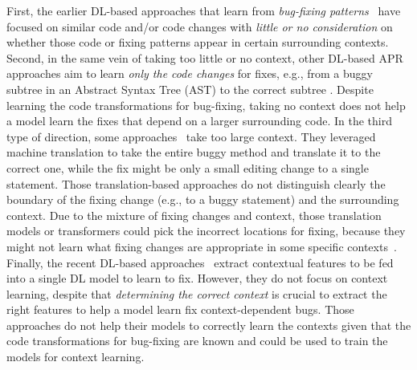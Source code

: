 First, the earlier DL-based approaches that learn from {\em bug-fixing
  patterns}~\cite{white2016deep,gupta2017deepfix} have focused on
similar code and/or code changes with {\em little or no consideration}
on whether those code or fixing patterns appear in certain surrounding
contexts. Second, in the same vein of taking too little or no context,
other DL-based APR approaches aim to learn {\em only the code changes}
for fixes, e.g., from a buggy subtree in an Abstract Syntax Tree (AST)
to the correct subtree \cite{chakrabortycodit,see2017get}. Despite
learning the code transformations for bug-fixing, taking no context
does not help a model learn the fixes that depend on a larger
surrounding code. In the third type of direction, some
approaches~\cite{hata2018learning,tufano2019learning,tufano2018empirical}
take too large context. They leveraged machine translation to take the
entire buggy method and translate it to the correct one, while the fix
might be only a small editing change to a single statement. Those
translation-based approaches do not distinguish clearly the boundary
of the fixing change (e.g., to a buggy statement) and the surrounding
context. Due to the mixture of fixing changes and context, those
translation models or transformers could pick the incorrect locations
for fixing, because they might not learn what fixing changes are
appropriate in some specific contexts~\cite{icse20}. Finally, the
recent DL-based
approaches~\cite{chen2018sequencer,cure-icse21,lutellier2020coconut,icse22}
extract contextual features to be fed into a single DL model to learn
to fix. However, they do not focus on context learning, despite that
{\em determining the correct context} is crucial to extract the right
features to help a model learn fix context-dependent bugs. Those
approaches do not help their models to correctly learn the contexts
given that the code transformations for bug-fixing are known and could
be used to train the models for context learning.



